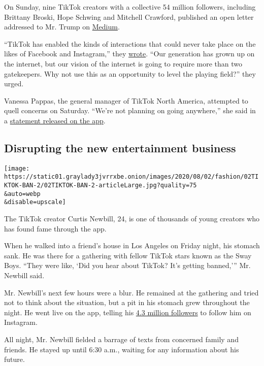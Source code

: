 On Sunday, nine TikTok creators with a collective 54 million followers,
including Brittany Broski, Hope Schwing and Mitchell Crawford, published
an open letter addressed to Mr. Trump on
\href{https://medium.com/@whoismax/dear-president-trump-an-open-letter-from-the-tiktok-creator-community-e56b21c682fb}{Medium}.

``TikTok has enabled the kinds of interactions that could never take
place on the likes of Facebook and Instagram,'' they
\href{https://medium.com/@whoismax/dear-president-trump-an-open-letter-from-the-tiktok-creator-community-e56b21c682fb}{wrote}.
``Our generation has grown up on the internet, but our vision of the
internet is going to require more than two gatekeepers. Why not use this
as an opportunity to level the playing field?'' they urged.

Vanessa Pappas, the general manager of TikTok North America, attempted
to quell concerns on Saturday. ``We're not planning on going anywhere,''
she said in a
\href{https://twitter.com/TaylorLorenz/status/1289579919358545920}{statement
released on the app}.

\hypertarget{disrupting-the-new-entertainment-business}{%
\subsection{Disrupting the new entertainment
business}\label{disrupting-the-new-entertainment-business}}

\texttt{[image: https://static01.graylady3jvrrxbe.onion/images/2020/08/02/fashion/02TIKTOK-BAN-2/02TIKTOK-BAN-2-articleLarge.jpg?quality=75\\\&auto=webp\\\&disable=upscale]}

The TikTok creator Curtis Newbill, 24, is one of thousands of young
creators who has found fame through the app.

When he walked into a friend's house in Los Angeles on Friday night, his
stomach sank. He was there for a gathering with fellow TikTok stars
known as the Sway Boys. ``They were like, `Did you hear about TikTok?
It's getting banned,''' Mr. Newbill said.

Mr. Newbill's next few hours were a blur. He remained at the gathering
and tried not to think about the situation, but a pit in his stomach
grew throughout the night. He went live on the app, telling his
\href{https://www.tiktok.com/@curtisnewbill}{4.3 million followers} to
follow him on Instagram.

All night, Mr. Newbill fielded a barrage of texts from concerned family
and friends. He stayed up until 6:30 a.m., waiting for any information
about his future.

